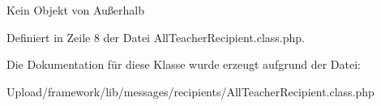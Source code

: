 Kein Objekt von Außerhalb 

Definiert in Zeile 8 der Datei All\+Teacher\+Recipient.\+class.\+php.



Die Dokumentation für diese Klasse wurde erzeugt aufgrund der Datei\+:\begin{DoxyCompactItemize}
\item 
Upload/framework/lib/messages/recipients/All\+Teacher\+Recipient.\+class.\+php\end{DoxyCompactItemize}
